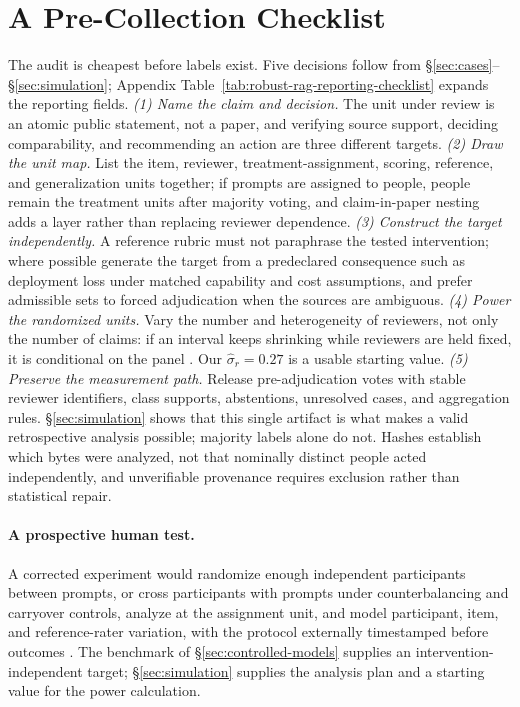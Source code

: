 \documentclass[11pt]{article}
\begin{document}
\section{A Pre-Collection Checklist}
\label{sec:practical-audit}

The audit is cheapest before labels exist. Five decisions follow from
\S\ref{sec:cases}--\S\ref{sec:simulation}; Appendix
Table~\ref{tab:robust-rag-reporting-checklist} expands the reporting fields.
\emph{(1) Name the claim and decision.} The unit under review is an atomic
public statement, not a paper, and verifying source support, deciding
comparability, and recommending an action are three different targets.
\emph{(2) Draw the unit map.} List the item, reviewer, treatment-assignment,
scoring, reference, and generalization units together; if prompts are assigned
to people, people remain the treatment units after majority voting, and
claim-in-paper nesting adds a layer rather than replacing reviewer dependence.
\emph{(3) Construct the target independently.} A reference rubric must not
paraphrase the tested intervention; where possible generate the target from a
predeclared consequence such as deployment loss under matched capability and
cost assumptions, and prefer admissible sets to forced adjudication when the
sources are ambiguous. \emph{(4) Power the randomized units.} Vary the number
and heterogeneity of reviewers, not only the number of claims: if an interval
keeps shrinking while reviewers are held fixed, it is conditional on the panel
\citep{card2020power}. Our $\hat\sigma_r=0.27$ is a usable starting value.
\emph{(5) Preserve the measurement path.} Release pre-adjudication votes with
stable reviewer identifiers, class supports, abstentions, unresolved cases, and
aggregation rules. \S\ref{sec:simulation} shows that this single artifact is
what makes a valid retrospective analysis possible; majority labels alone do
not. Hashes establish which bytes were analyzed, not that nominally distinct
people acted independently, and unverifiable provenance requires exclusion
rather than statistical repair.

\paragraph{A prospective human test.}
A corrected experiment would randomize enough independent participants between
prompts, or cross participants with prompts under counterbalancing and
carryover controls, analyze at the assignment unit, and model participant,
item, and reference-rater variation, with the protocol externally timestamped
before outcomes \citep{vanmiltenburg2021preregistering}. The benchmark of
\S\ref{sec:controlled-models} supplies an intervention-independent target;
\S\ref{sec:simulation} supplies the analysis plan and a starting value for the
power calculation.
\end{document}
